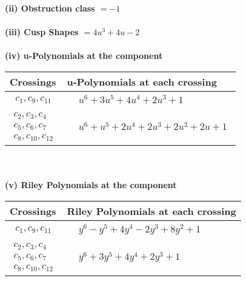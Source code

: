 \documentclass[1p]{elsarticle_modified}
\theoremstyle{definition}
\begin{document}
\flushleft \textbf{(ii) Obstruction class $= -1$}\\~\\
\flushleft \textbf{(iii) Cusp Shapes $= 4 u^3+4 u-2$}\\~\\
\newpage\renewcommand{\arraystretch}{1}
\flushleft \textbf{(iv) u-Polynomials at the component}\newline \\
\begin{tabular}{m{50pt}|m{274pt}}
Crossings & \hspace{64pt}u-Polynomials at each crossing \\
\hline $$\begin{aligned}c_{1},c_{9},c_{11}\end{aligned}$$&$\begin{aligned}
&u^6+3 u^5+4 u^4+2 u^3+1
\end{aligned}$\\
\hline $$\begin{aligned}c_{2},c_{3},c_{4}\\c_{5},c_{6},c_{7}\\c_{8},c_{10},c_{12}\end{aligned}$$&$\begin{aligned}
&u^6+u^5+2 u^4+2 u^3+2 u^2+2 u+1
\end{aligned}$\\
\hline
\end{tabular}\\~\\
\newpage\renewcommand{\arraystretch}{1}
\flushleft \textbf{(v) Riley Polynomials at the component}\newline \\
\begin{tabular}{m{50pt}|m{274pt}}
Crossings & \hspace{64pt}Riley Polynomials at each crossing \\
\hline $$\begin{aligned}c_{1},c_{9},c_{11}\end{aligned}$$&$\begin{aligned}
&y^6- y^5+4 y^4-2 y^3+8 y^2+1
\end{aligned}$\\
\hline $$\begin{aligned}c_{2},c_{3},c_{4}\\c_{5},c_{6},c_{7}\\c_{8},c_{10},c_{12}\end{aligned}$$&$\begin{aligned}
&y^6+3 y^5+4 y^4+2 y^3+1
\end{aligned}$\\
\hline
\end{tabular}\\~\\
\end{document}
